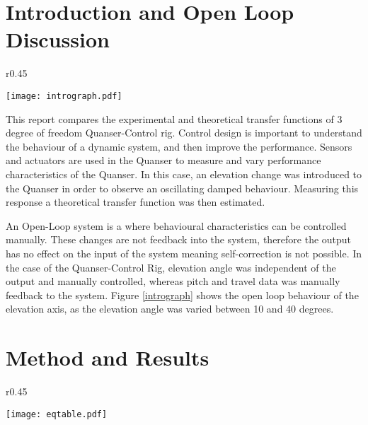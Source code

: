 \section{Introduction and Open Loop
Discussion}\label{introduction-and-open-loop-discussion}

\begin{wrapfigure}{r}{0.45\textwidth}
  \begin{center}
  \vspace{-20pt}
  \texttt{[image: intrograph.pdf]}
  \end{center}
  \caption{Graph Showing the Open Loop Nature of the Experimental Quanser Response}
  \label{intrograph}
  \vspace{-15pt}
\end{wrapfigure}

This report compares the experimental and theoretical transfer functions
of 3 degree of freedom Quanser-Control rig. Control design is important
to understand the behaviour of a dynamic system, and then improve the
performance. Sensors and actuators are used in the Quanser to measure
and vary performance characteristics of the Quanser. In this case, an
elevation change was introduced to the Quanser in order to observe an
oscillating damped behaviour. Measuring this response a theoretical
transfer function was then estimated.

An Open-Loop system is a where behavioural characteristics can be
controlled manually. These changes are not feedback into the system,
therefore the output has no effect on the input of the system
\cite{openloop} meaning self-correction is not possible. In the case of
the Quanser-Control Rig, elevation angle was independent of the output
and manually controlled, whereas pitch and travel data was manually
feedback to the system. Figure \ref{intrograph} shows the open loop
behaviour of the elevation axis, as the elevation angle was varied
between 10 and 40 degrees.

\section{Method and Results}\label{method-and-results}

\begin{wrapfigure}{r}{0.45\textwidth}
  \vspace{0pt}
  \begin{center}
  \texttt{[image: eqtable.pdf]}
\end{center}
\label{eqtable}
  \vspace{0pt}
\end{wrapfigure}

